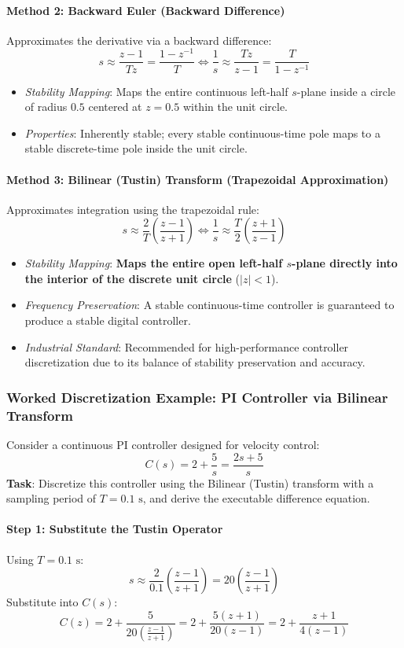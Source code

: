 \documentclass[12pt,onecolumn,twoside ]{article}
\begin{document}
	\paragraph{Method 2: Backward Euler (Backward Difference)}
	Approximates the derivative via a backward difference: \[
	s \approx \frac{z - 1}{T z} = \frac{1 - z^{-1}}{T} \iff \frac{1}{s} \approx \frac{T z}{z - 1} = \frac{T}{1 - z^{-1}}
	\]
	\begin{itemize}
		\item
		\textit{Stability Mapping}: Maps the entire continuous left-half $s$-plane inside a circle of radius $0.5$ centered at $z = 0.5$ within the unit circle.
		\item
		\textit{Properties}: Inherently stable; every stable continuous-time pole maps to a stable discrete-time pole inside the unit circle.
	\end{itemize}
	\paragraph{Method 3: Bilinear (Tustin) Transform (Trapezoidal Approximation)}
	Approximates integration using the trapezoidal rule: \[
	s \approx \frac{2}{T} \left( \frac{z - 1}{z + 1} \right) \iff \frac{1}{s} \approx \frac{T}{2} \left( \frac{z + 1}{z - 1} \right)
	\]
	\begin{itemize}
		\item
		\textit{Stability Mapping}: \textbf{Maps the entire open left-half $s$-plane directly into the interior of the discrete unit circle} ($|z| < 1$).
		\item
		\textit{Frequency Preservation}: A stable continuous-time controller is guaranteed to produce a stable digital controller.
		\item
		\textit{Industrial Standard}: Recommended for high-performance controller discretization due to its balance of stability preservation and accuracy.
	\end{itemize}
	
	\subsubsection{Worked Discretization Example: PI Controller via Bilinear Transform}
	Consider a continuous PI controller designed for velocity control: \[
	C(s) = 2 + \frac{5}{s} = \frac{2s + 5}{s}
	\] \textbf{Task}: Discretize this controller using the Bilinear (Tustin) transform with a sampling period of $T = 0.1\text{ s}$, and derive the executable difference equation.
	\paragraph{Step 1: Substitute the Tustin Operator}
	Using $T = 0.1\text{ s}$: \[
	s \approx \frac{2}{0.1} \left( \frac{z - 1}{z + 1} \right) = 20 \left( \frac{z - 1}{z + 1} \right)
	\]
	Substitute into $C(s)$: \[
	C(z) = 2 + \frac{5}{20 \left( \frac{z - 1}{z + 1} \right)} = 2 + \frac{5(z + 1)}{20(z - 1)} = 2 + \frac{z + 1}{4(z - 1)}
	\]
\end{document}
